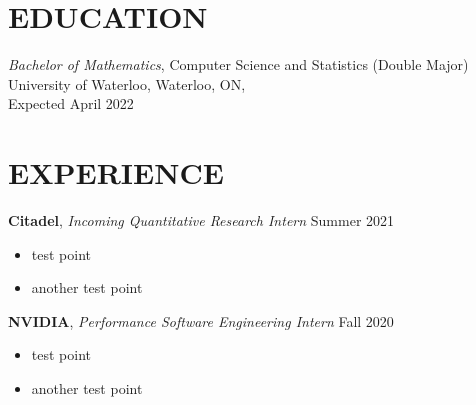 \documentclass[line,margin]{res}
\begin{document}
\address{
    (647) 643-4450 $\cdot$
    \href{mailto:nbvadive@uwaterloo.ca}{nbvadive@uwaterloo.ca} $\cdot$
    \href{https://nicholasvadivelu.com/}{nicholasvadivelu.com}
}


\begin{resume}
\vspace{-4mm}



\section{EDUCATION}
    \textit{Bachelor of Mathematics}, Computer Science and Statistics (Double Major) \\
    University of Waterloo, Waterloo, ON, \\
    Expected April 2022 \\


\section{EXPERIENCE}
    \textbf{Citadel}, \textit{Incoming Quantitative Research Intern} \hfill Summer 2021\\
        \vspace{-4mm}
        \begin{itemize}  \itemsep -2pt %
        \item test point
        \item another test point
        \end{itemize}

    \textbf{NVIDIA}, \textit{Performance Software Engineering Intern} \hfill Fall 2020\\
        \vspace{-4mm}
        \begin{itemize}  \itemsep -2pt %
        \item test point
        \item another test point
        \end{itemize}



\end{resume}
\end{document}

